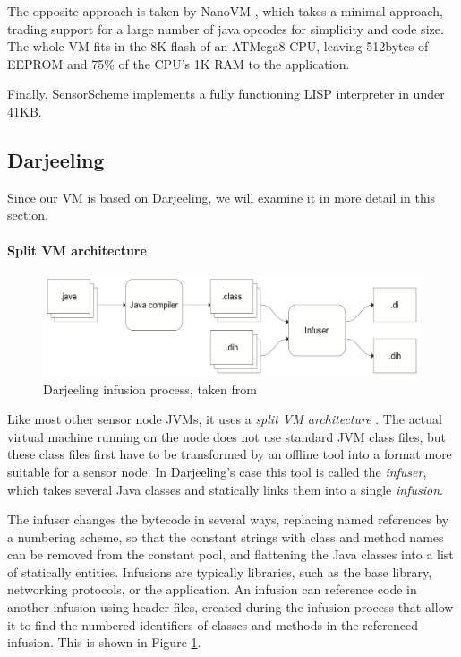 The opposite approach is taken by NanoVM \cite{Harbaum}, which takes a minimal approach, trading support for a large number of java opcodes for simplicity and code size. The whole VM fits in the 8K flash of an ATMega8 CPU, leaving 512bytes of EEPROM and 75\% of the CPU's 1K RAM to the application.

Finally, SensorScheme \cite{Evers:2010ur} implements a fully functioning LISP interpreter in under 41KB.

\subsection{Darjeeling}
Since our VM is based on Darjeeling, we will examine it in more detail in this section.

\paragraph{Split VM architecture}
\begin{figure}[H]
	\centering
	\includegraphics[width=0.6\linewidth]{darjeeling-infusion-process}
	\caption{Darjeeling infusion process, taken from \cite{Brouwers:2009cj}}
	\label{fig-darjeeling-infusion-process}
\end{figure}
Like most other sensor node JVMs, it uses a \emph{split VM architecture} \cite{Simon:2006wd}. The actual virtual machine running on the node does not use standard JVM class files, but these class files first have to be transformed by an offline tool into a format more suitable for a sensor node. In Darjeeling's case this tool is called the \emph{infuser}, which takes several Java classes and statically links them into a single \emph{infusion}.

The infuser changes the bytecode in several ways, replacing named references by a numbering scheme, so that the constant strings with class and method names can be removed from the constant pool, and flattening the Java classes into a list of statically entities. Infusions are typically libraries, such as the  base library, networking protocols, or the application. An infusion can reference code in another infusion using header files, created during the infusion process that allow it to find the numbered identifiers of classes and methods in the referenced infusion. This is shown in Figure \ref{fig-darjeeling-infusion-process}.

